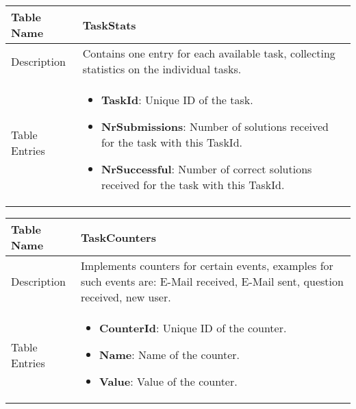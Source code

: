 \begin{tabular}{|p{3cm}|p{10cm}|}
\hline
Table Name & TaskStats \\
\hline
Description & Contains one entry for each available task, collecting statistics on the individual tasks.\\
\hline
Table Entries & \begin{itemize}
        \item {\bf TaskId}: Unique ID of the task.
        \item {\bf NrSubmissions}: Number of solutions received for the task with this TaskId.
        \item {\bf NrSuccessful}: Number of correct solutions received for the task with this TaskId.
        \end{itemize} \\
\hline
\end{tabular}

\begin{tabular}{|p{3cm}|p{10cm}|}
\hline
Table Name & TaskCounters \\
\hline
Description & Implements counters for certain events, examples for such events are: E-Mail received, E-Mail sent,
question received, new user.\\
\hline
Table Entries & \begin{itemize}
        \item {\bf CounterId}: Unique ID of the counter.
        \item {\bf Name}: Name of the counter.
        \item {\bf Value}: Value of the counter.
        \end{itemize} \\
\hline
\end{tabular}


